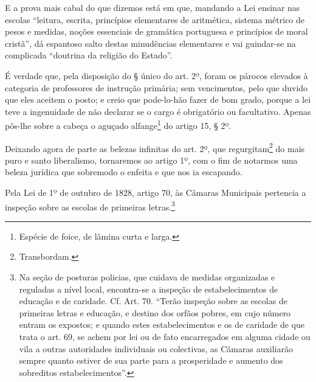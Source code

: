 E a prova mais cabal do que dizemos está em que, mandando a Lei ensinar
nas escolas ``leitura, escrita, princípios elementares de aritmética,
sistema métrico de pesos e medidas, noções essenciais de gramática
portuguesa e princípios de moral cristã'', dá espantoso salto destas
minudências elementares e vai guindar-se na complicada ``doutrina da
religião do Estado''.

É verdade que, pela disposição do § único do art. 2º, foram os párocos
elevados à categoria de professores de instrução primária; sem
vencimentos, pelo que duvido que eles aceitem o posto; e creio que
pode-lo-hão fazer de bom grado, porque a lei teve a ingenuidade de não
declarar se o cargo é obrigatório ou facultativo. Apenas pôs-lhe sobre a
cabeça o aguçado alfange\footnote{Espécie de foice, de lâmina curta e
  larga.} do artigo 15, § 2º.

Deixando agora de parte as belezas infinitas do art. 2º, que
regurgitam\footnote{Transbordam.} do mais puro e santo liberalismo,
tornaremos ao artigo 1º, com o fim de notarmos uma beleza jurídica que
sobremodo o enfeita e que nos ia escapando.

Pela Lei de 1º de outubro de 1828, artigo 70, às Câmaras Municipais
pertencia a inspeção sobre as escolas de primeiras letras.\footnote{Na
  seção de posturas policias, que cuidava de medidas organizadas e
  reguladas a nível local, encontra-se a inspeção de estabelecimentos de
  educação e de caridade. Cf. Art. 70. ``Terão inspeção sobre as escolas
  de primeiras letras e educação, e destino dos orfãos pobres, em cujo
  número entram os expostos; e quando estes estabelecimentos e os de
  caridade de que trata o art. 69, se achem por lei ou de fato
  encarregados em alguma cidade ou vila a outras autoridades individuais
  ou colectivas, as Câmaras auxiliarão sempre quanto estiver de sua
  parte para a prosperidade e aumento dos sobreditos estabelecimentos''.}

